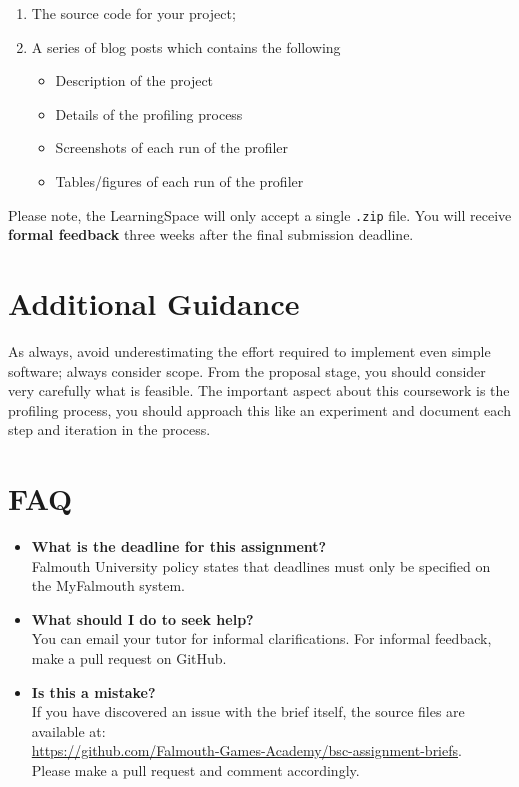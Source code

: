\documentclass{../../fal_assignment}
\begin{document}
\begin{enumerate}[label=(\alph*)]
	\item The source code for your project;
	\item A series of blog posts which contains the following
	\begin{itemize}
		\item Description of the project
		\item Details of the profiling process
		\item Screenshots of each run of the profiler
		\item Tables/figures of each run of the profiler
	\end{itemize}
\end{enumerate}

Please note, the LearningSpace will only accept a single \texttt{.zip} file. You will receive \textbf{formal feedback} three weeks after the final submission deadline.

\section*{Additional Guidance}

As always, avoid underestimating the effort required to implement even simple software; always consider scope.
From the proposal stage, you should consider very carefully what is feasible. The important aspect about this coursework is the profiling process, you should approach this like an experiment and document each step and iteration in the process.



\section*{FAQ}

\begin{itemize}
	\item 	\textbf{What is the deadline for this assignment?} \\ 
    		Falmouth University policy states that deadlines must only be specified on the MyFalmouth system.
    		
	\item 	\textbf{What should I do to seek help?} \\ 
    		You can email your tutor for informal clarifications. For informal feedback, make a pull request on GitHub. 
    		
    	\item 	\textbf{Is this a mistake?} \\ 	
    		If you have discovered an issue with the brief itself, the source files are available at: \\
    		\url{https://github.com/Falmouth-Games-Academy/bsc-assignment-briefs}.\\
    		 Please make a pull request and comment accordingly.
\end{itemize}
\end{document}
